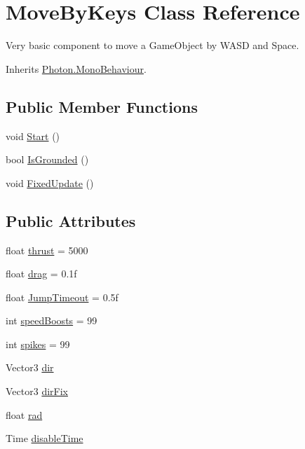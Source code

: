 \hypertarget{class_move_by_keys}{}\section{Move\+By\+Keys Class Reference}
\label{class_move_by_keys}


Very basic component to move a Game\+Object by W\+A\+SD and Space.  




Inherits \hyperlink{class_photon_1_1_mono_behaviour}{Photon.\+Mono\+Behaviour}.

\subsection*{Public Member Functions}
\begin{DoxyCompactItemize}
\item 
void \hyperlink{class_move_by_keys_a12c386cc63b886a811e2801c6631f7c6}{Start} ()
\item 
bool \hyperlink{class_move_by_keys_a12f570fff90c264f8ff855d82886d732}{Is\+Grounded} ()
\item 
void \hyperlink{class_move_by_keys_aeeea5b489d6daab0aa8e9fc1672f5310}{Fixed\+Update} ()
\end{DoxyCompactItemize}
\subsection*{Public Attributes}
\begin{DoxyCompactItemize}
\item 
float \hyperlink{class_move_by_keys_a5702f7b18a522ed877f1c1683e3acd6e}{thrust} = 5000
\item 
float \hyperlink{class_move_by_keys_a5edbdd945711dcfbe8bb4f167ba58792}{drag} = 0.\+1f
\item 
float \hyperlink{class_move_by_keys_a78f351dfc4cfdf17213df54dee9ba73f}{Jump\+Timeout} = 0.\+5f
\item 
int \hyperlink{class_move_by_keys_abe7c462b0359cd7923ee81166dcbce50}{speed\+Boosts} = 99
\item 
int \hyperlink{class_move_by_keys_a69b4ceaaa671fa3a62ee1281b7c755b7}{spikes} = 99
\item 
Vector3 \hyperlink{class_move_by_keys_a06a0f4cd939aba5cf42ad4aa1626ec55}{dir}
\item 
Vector3 \hyperlink{class_move_by_keys_abf85f85c6014dd249ceb5d5d6bd54353}{dir\+Fix}
\item 
float \hyperlink{class_move_by_keys_ab257d4fc7ebb9aa457bb19c85dc7874d}{rad}
\item 
Time \hyperlink{class_move_by_keys_abc8e3273ebda7bbcfb644708d97d00af}{disable\+Time}
\end{DoxyCompactItemize}
